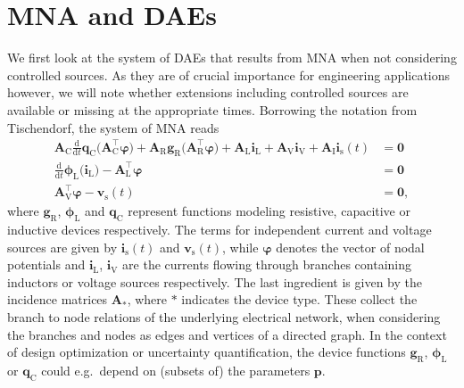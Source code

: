 \documentclass[AMA,STIX1COL]{WileyNJD-v2}
\newcommand{\mb}[1]{\mathbf{#1}}
\newcommand{\mr}[1]{\mathrm{#1}}
\newcommand{\T}{{\!\top}}
\newcommand{\ddt}{\frac{\mathrm{d}}{\mathrm{d}t}}
\newcommand{\A}[1]{\mb{A}_\mr{#1}}
\newcommand{\AT}[1]{\mb{A}_\mr{#1}^{\T}}
\newcommand{\qC}{\mb{q}_\mr{C}}
\newcommand{\gR}{\mb{g}_\mr{R}}
\newcommand{\phiL}{\boldsymbol{\phi}_\mr{L}}
\newcommand{\vphi}{\boldsymbol{\varphi}}
\renewcommand{\i}[1]{\mb{i}_\mr{#1}}
\renewcommand{\v}[1]{\mb{v}_\mr{#1}}
\begin{document}
\section{MNA and DAEs}
\label{sec:md}
We first look at the system of DAEs that results from MNA when not considering controlled sources. As they are of crucial importance for engineering applications however, we will note whether extensions including controlled sources are available or missing at the appropriate times. Borrowing the notation from Tischendorf\cite{tischendorf1999}, the system of MNA reads
\begin{subequations}
    \label{eq:md_mnai}
    \begin{align}
            \A{C} \ddt \qC \big( \AT{C} \vphi \big) + \A{R} \gR \big( \AT{R} \vphi \big) + \A{L} \i{L} + \A{V} \i{V} + \A{I} \i{s}(t) &= \mb{0}\\ 
            \ddt \phiL \big( \i{L} \big) - \AT{L} \vphi &= \mb{0}\\
            \AT{V} \vphi - \v{s}(t)&= \mb{0},
    \end{align}
\end{subequations}
where $\gR$, $\phiL$ and $\qC$ represent functions modeling resistive, capacitive or inductive devices respectively. The terms for independent current and voltage sources are given by $\i{s}(t)$ and $\v{s}(t)$, while $\vphi$ denotes the vector of nodal potentials and $\i{L} $, $\i{V}$ are the currents flowing through branches containing inductors or voltage sources respectively. The last ingredient is given by the incidence matrices $\A{*}$, where $*$ indicates the device type. These collect the branch to node relations of the underlying electrical network, when considering the branches and nodes as edges and vertices of a directed graph. In the context of design optimization or uncertainty quantification, the device functions $\gR$, $\phiL$ or $\qC$ could e.g.~depend on (subsets of) the parameters $\mb{p}$.
\end{document}
